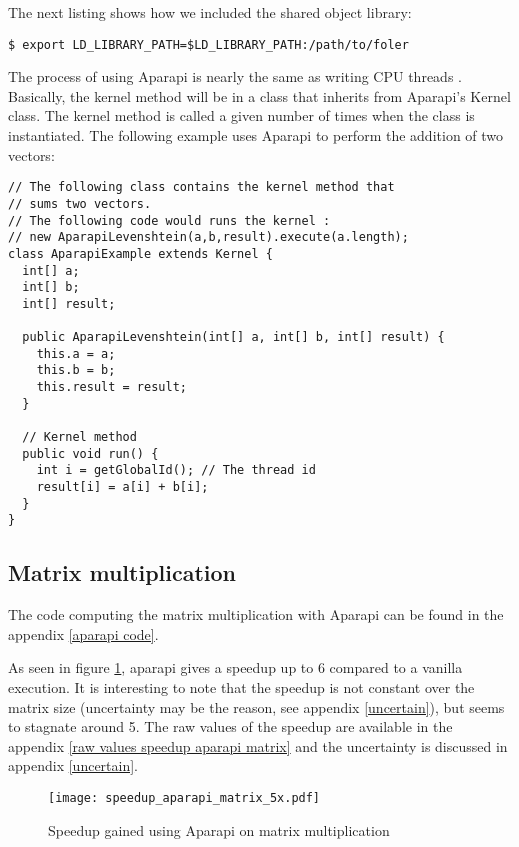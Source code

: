 The next listing shows how we included the shared object library:

\begin{lstlisting}
$ export LD_LIBRARY_PATH=$LD_LIBRARY_PATH:/path/to/foler
\end{lstlisting}

The process of using Aparapi is nearly the same as writing CPU threads \cite{aparapiarticle}. Basically, the kernel method will be in a class that inherits from Aparapi's Kernel class. The kernel method is called a given number of times when the class is instantiated. The following example uses Aparapi to perform the addition of two vectors:

\begin{lstlisting}
// The following class contains the kernel method that
// sums two vectors.
// The following code would runs the kernel :
// new AparapiLevenshtein(a,b,result).execute(a.length);
class AparapiExample extends Kernel {
  int[] a;
  int[] b;
  int[] result;
  
  public AparapiLevenshtein(int[] a, int[] b, int[] result) {
    this.a = a;
    this.b = b;
    this.result = result;
  }

  // Kernel method
  public void run() {
    int i = getGlobalId(); // The thread id
    result[i] = a[i] + b[i];
  }
}

\end{lstlisting}

\subsection{Matrix multiplication}

The code computing the matrix multiplication with Aparapi can be found in the appendix \ref{aparapi code}.

As seen in figure \ref{fig plot matrix aparapi}, aparapi gives a speedup up to 6 compared to a vanilla execution. It is interesting to note that the speedup is not constant over the matrix size (uncertainty may be the reason, see appendix \ref{uncertain}), but seems to stagnate around 5. The raw values of the speedup are available in the appendix \ref{raw values speedup aparapi matrix} and the uncertainty is discussed in appendix \ref{uncertain}.

\begin{figure}[H]
\centering
\texttt{[image: speedup\_aparapi\_matrix\_5x.pdf]}
\caption{Speedup gained using Aparapi on matrix multiplication}
\label{fig plot matrix aparapi}
\end{figure}


